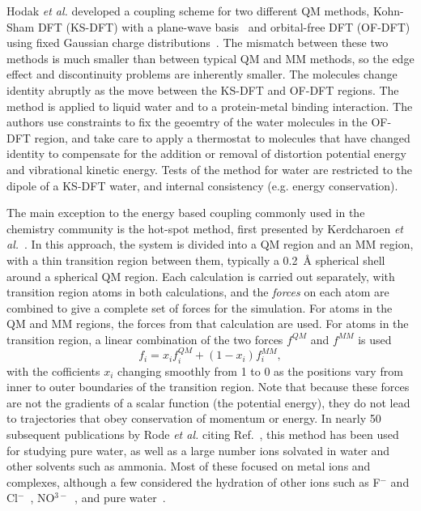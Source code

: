 \documentclass[11pt]{revtex4}
\begin{document}
Hodak {\it et al.} developed a coupling scheme for two different
QM methods, Kohn-Sham DFT (KS-DFT) with a plane-wave basis~\cite{kohn_phys_rev_1965a}
and orbital-free DFT (OF-DFT) using fixed Gaussian charge
distributions~\cite{hodak_j_chem_phys_2008a}.  The mismatch between
these two methods is much smaller than between typical QM and MM
methods, so the edge effect and discontinuity problems are inherently
smaller.  The molecules change identity abruptly as the move between
the KS-DFT and OF-DFT regions.  The method is applied to liquid
water and to a protein-metal binding interaction.  The authors use
constraints to fix the geoemtry of the water molecules in the OF-DFT
region, and take care to apply a thermostat to molecules that have
changed identity to compensate for the addition or removal of
distortion potential energy and vibrational kinetic energy.  Tests
of the method for water are restricted to the dipole of a KS-DFT
water, and internal consistency (e.g. energy conservation).

The main exception to the energy based coupling commonly used in
the chemistry community is the hot-spot method, first presented by
Kerdcharoen {\it et al.}~\cite{kerdcharoen_chem_phys_1996a}.  In
this approach, the system is divided into a QM region and an MM
region, with a thin transition region between them, typically a
0.2~{\AA} spherical shell around a spherical QM region.  Each
calculation is carried out separately, with transition region atoms
in both calculations, and the {\em forces} on each atom are combined
to give a complete set of forces for the simulation.   For atoms
in the QM and MM regions, the forces from that calculation are used.
For atoms in the transition region, a linear combination of the two
forces $f^{QM}$ and $f^{MM}$ is used
$$f_i = x_i f_i^{QM} + (1-x_i) f_i^{MM},$$
with the cofficients $x_i$ changing smoothly from 1 to 0
as the positions vary from inner to outer boundaries of the transition
region.  Note that because these forces are not the gradients of a
scalar function (the potential energy), they do not lead to
trajectories that obey conservation of momentum or energy.  In
nearly 50 subsequent publications by Rode {\it et al.} citing
Ref.~, this method has been
used for studying pure water, as well as a large number ions solvated
in water and other solvents such as ammonia.  Most of these focused
on metal ions and complexes, although a few considered the hydration
of other ions such as F$^-$ and
Cl$^-$~\cite{tongraar_phys_chem_chem_phys_2003a},
NO$^{3-}$~\cite{tongraar_j_phys_chem_a_2006a}, and pure
water~\cite{xenides_j_chem_phys_2005a,xenides_j_mol_liq_2006a}.
\end{document}

